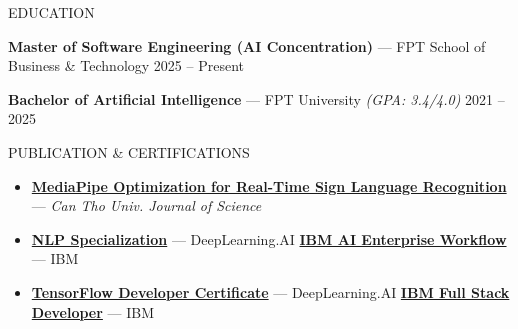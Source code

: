 \documentclass[10pt]{resume}
\begin{document}
\begin{rSection}{EDUCATION}

\textbf{Master of Software Engineering (AI Concentration)}
--- FPT School of Business \& Technology
\hfill 2025 -- Present

\textbf{Bachelor of Artificial Intelligence}
--- FPT University \textit{(GPA: 3.4/4.0)}
\hfill 2021 -- 2025

\end{rSection}

\begin{rSection}{PUBLICATION \& CERTIFICATIONS}

\begin{itemize}
    \item \href{https://ctujs.ctu.edu.vn/index.php/ctujs/article/view/716}
    {\textbf{MediaPipe Optimization for Real-Time Sign Language Recognition}}
    --- \textit{Can Tho Univ. Journal of Science}

    \item \href{https://www.coursera.org/account/accomplishments/specialization/SNVPADABDEJE}
    {\textbf{NLP Specialization}}
    --- DeepLearning.AI
    \quad
    \href{https://www.coursera.org/account/accomplishments/specialization/9487QFFKTT67}
    {\textbf{IBM AI Enterprise Workflow}}
    --- IBM

    \item \href{https://www.coursera.org/account/accomplishments/specialization/VNFNEQYKKLFH}
    {\textbf{TensorFlow Developer Certificate}}
    --- DeepLearning.AI
    \quad
    \href{https://www.coursera.org/account/accomplishments/specialization/LPDSP3FLTGYH}
    {\textbf{IBM Full Stack Developer}}
    --- IBM
\end{itemize}

\end{rSection}
\end{document}
